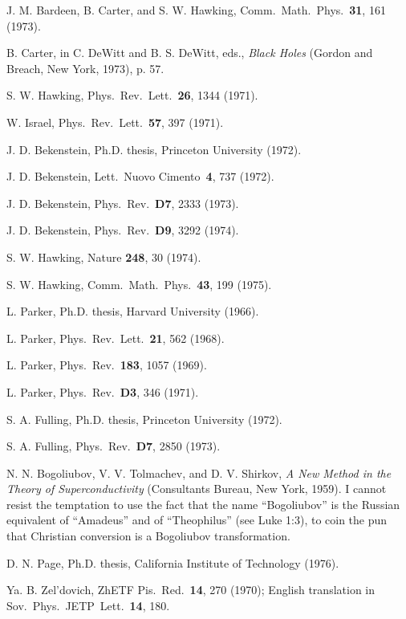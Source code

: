\documentclass[12pt]{article} \usepackage{latexsym}
\begin{document}

\begin{thebibliography}{99}


 J. M. Bardeen, B. Carter, and S. W. Hawking, Comm.\
  Math.\ Phys.\ {\bf 31}, 161 (1973).

 B. Carter, in C. DeWitt and B. S. DeWitt, eds.,
  \emph{Black Holes} (Gordon and Breach, New York, 1973), p. 57.

 S. W. Hawking, Phys.\ Rev.\ Lett.\ {\bf 26},
  1344 (1971).

 W. Israel,  Phys.\ Rev.\ Lett.\ {\bf 57}, 397 (1971).

 J. D. Bekenstein, Ph.D. thesis, Princeton University
  (1972).

 J. D. Bekenstein, Lett.\ Nuovo Cimento\ {\bf 4}, 737
  (1972).

 J. D. Bekenstein, Phys.\ Rev.\ {\bf D7}, 2333 (1973).

 J. D. Bekenstein, Phys.\ Rev.\ {\bf D9}, 3292 (1974).

 S. W. Hawking, Nature {\bf 248}, 30 (1974).

 S. W. Hawking, Comm.\ Math.\ Phys.\ {\bf 43}, 199
  (1975).
  
 L. Parker, Ph.D. thesis, Harvard University (1966).

 L. Parker, Phys.\ Rev.\ Lett.\ {\bf 21}, 562 (1968).

 L. Parker, Phys.\ Rev.\ {\bf 183}, 1057 (1969).

 L. Parker, Phys.\ Rev.\ {\bf D3}, 346 (1971).

 S. A. Fulling, Ph.D. thesis, Princeton University
(1972).

 S. A. Fulling, Phys.\ Rev.\ {\bf D7}, 2850 (1973).

 N. N. Bogoliubov, V. V. Tolmachev, and D. V. Shirkov,
\emph{A New Method in the Theory of Superconductivity} (Consultants
Bureau, New York, 1959).  I cannot resist the temptation to use the
fact that the name ``Bogoliubov'' is the Russian equivalent of
``Amadeus'' and of ``Theophilus'' (see Luke 1:3), to coin the pun that
Christian conversion is a Bogoliubov transformation.

 D. N. Page, Ph.D. thesis, California Institute of
  Technology (1976).

 Ya. B. Zel'dovich, ZhETF Pis.\ Red.\ {\bf 14}, 270
  (1970); English translation in Sov.\ Phys.\ JETP\ Lett.\ {\bf 14},
  180.


\end{thebibliography}
\end{document}
